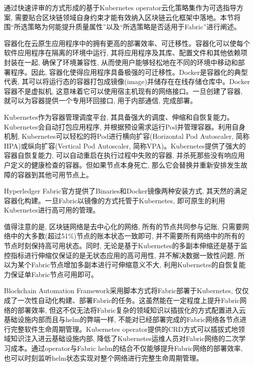 通过快速评审的方式形成的基于Kubernetes operator云化策略集作为可选指导方案, 需要贴合区块链领域自身约束才能有效纳入区块链云化框架中落地。本节将围“所选策略为何能提升质量属性”以及“所选策略是否适用于Fabric”进行阐述。

容器化在云原生应用程序中的拥有更高的部署效率\cite{zhou2021container}、可迁移性。容器化可以使每个软件应用程序在隔离的环境中运行, 其将应用程序及其库、配置文件和其他依赖项封装在一起, 确保了环境兼容性, 从而使用户能够轻松地在不同的环境中移动和部署程序。因此, 容器化使得应用程序具备极强的可迁移性。Docker\footnotemark[1]是容器化的典型代表, 其可以将运行态的容器打包成镜像(image)并储存在在线存储仓库中。Docker容器不是虚拟机, 这意味着它可以使用宿主机现有的网络接口\cite{shah2019building}。一旦创建了容器, 就可以为容器提供一个专用环回接口, 用于内部通信, 完成部署。

Kubernetes作为容器管理调度平台, 其具备强大的调度、伸缩和自恢复能力。Kubernetes会自动打包应用程序, 并根据预设需求运行Pod并管理容器。利用自身机制, Kubernetes可以轻松的将Pod进行横向扩容(Horizontal Pod Autoscaler, 简称HPA)或纵向扩容(Vertical Pod Autoscaler, 简称VPA)。Kubernetes提供了强大的容器自恢复能力, 可以自动重启在执行过程中失败的容器, 并杀死那些没有响应用户定义的健康检查的容器。但如果节点本身死亡, 那么它会替换并重新安排发生故障的容器到其他可用节点上。

Hyperledger Fabric官方提供了Binaries和Docker镜像两种安装方式\footnotemark[1], 其天然的满足容器化构建。一旦Fabric以镜像的方式托管于Kubernetes, 即可原生的利用Kubernetes进行高可用的管理。

值得注意的是, 区块链网络是去中心化的网络, 所有的节点共同参与记账, 只需要网络中的大多数(超过51\%)节点的账本状态一致即可, 并不需要所有网络中的所有的节点时刻保持高可用状态。同时, 无论是基于Kubernetes的多副本伸缩还是基于监控指标进行伸缩仅保证的是无状态应用的高可用性, 并不解决数据一致性问题, 所以为某个Fabric节点增加多副本进行可伸缩意义不大, 利用Kubernetes的自恢复能力保证单Fabric节点可用即可。

Blockchain Automation Framework采用脚本方式将Fabric部署于Kubernetes, 仅仅成了一次性自动化构建、部署Fabric的任务。这虽然能在一定程度上提升Fabric网络的部署效率, 但这不仅无法将Fabric复杂的领域知识以插拔化的方式配置进入云基础设施内部而且与helm的弊端一样, 不能对已经部署完成的Fabric网络各节点进行完整软件生命周期管理。Kubernetes operator提供的CRD方式可以插拔式地领域知识注入进云基础设施内部, 降低了Kubernetes运维人员对Fabric网络的二次学习成本。通过operator与Fabric helm的结合不仅能够提升Fabric网络的部署效率, 也可以时刻监听helm状态实现对整个网络进行完整生命周期管理。

